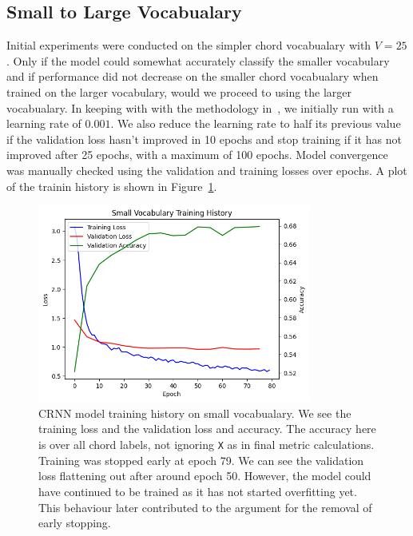 \subsection{Small to Large Vocabualary}

Initial experiments were conducted on the simpler chord vocabualary with $V=25$. Only if the model could somewhat accurately classify the smaller vocabulary and if performance did not decrease on the smaller chord vocabualary when trained on the larger vocabulary, would we proceed to using the larger vocabualary. In keeping with with the methodology in~\citet{StructuredTraining}, we initially run with a learning rate of $0.001$. We also reduce the learning rate to half its previous value if the validation loss hasn't improved in 10 epochs and stop training if it has not improved after 25 epochs, with a maximum of 100 epochs. Model convergence was manually checked using the validation and training losses over epochs. A plot of the trainin history is shown in Figure~\ref{fig:crnn_small_vocab_loss}.

\begin{figure}[h]
    \centering
    \includegraphics[width=0.8\textwidth]{figures/small_vocab_training_plot.png}
    \caption{CRNN model training history on small vocabualary. We see the training loss and the validation loss and accuracy. The accuracy here is over all chord labels, not ignoring \texttt{X} as in final metric calculations. Training was stopped early at epoch 79. We can see the validation loss flattening out after around epoch 50. However, the model could have continued to be trained as it has not started overfitting yet. This behaviour later contributed to the argument for the removal of early stopping.}\label{fig:crnn_small_vocab_loss}
\end{figure}

